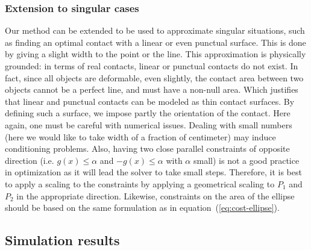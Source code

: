 \subsubsection{Extension to singular cases}
\label{subsubsec:singular_cases}
Our method can be extended to be used to approximate singular situations, such as finding an optimal contact with a linear or even punctual surface.
This is done by giving a slight width to the point or the line.
This approximation is physically grounded:
in terms of real contacts, linear or punctual contacts do not exist.
In fact, since all objects are deformable, even slightly, the contact area between two objects cannot be a perfect line, and must have a non-null area.
Which justifies that linear and punctual contacts can be modeled as thin contact surfaces.
By defining such a surface, we impose partly the orientation of the contact.
Here again, one must be careful with numerical issues.
Dealing with small numbers (here we would like to take width of a fraction of centimeter) may induce conditioning problems.
Also, having two close parallel constraints of opposite direction (i.e. $g(x)\leq \alpha$ and  $-g(x)\leq \alpha$ with $\alpha$ small) is not a good practice in optimization as it will lead the solver to take small steps.
Therefore, it is best to apply a scaling to the constraints by applying a geometrical scaling to $P_1$ and $P_2$ in the appropriate direction.\newline
Likewise, constraints on the area of the ellipse should be based on the same formulation as in equation~(\ref{eq:cost-ellipse}).

\subsection{Simulation results}
\label{subsec:simu}


